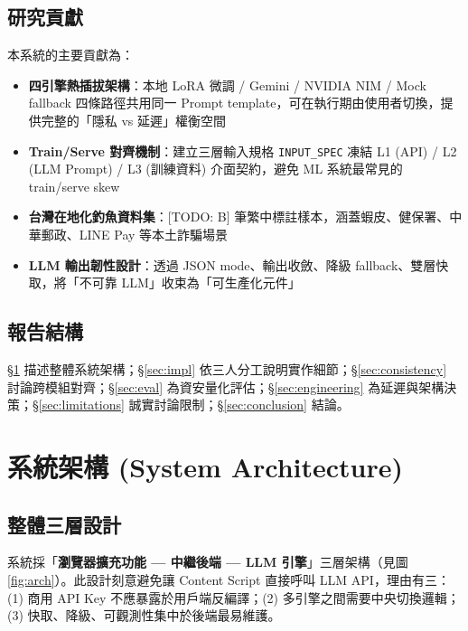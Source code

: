 \documentclass[11pt, a4paper]{article}
\begin{document}
\subsection{研究貢獻}
本系統的主要貢獻為：
\begin{itemize}[leftmargin=2em]
  \item \textbf{四引擎熱插拔架構}：本地 LoRA 微調 / Gemini / NVIDIA NIM / Mock fallback 四條路徑共用同一 Prompt template，可在執行期由使用者切換，提供完整的「隱私 vs 延遲」權衡空間
  \item \textbf{Train/Serve 對齊機制}：建立三層輸入規格 \texttt{INPUT\_SPEC} 凍結 L1 (API) / L2 (LLM Prompt) / L3 (訓練資料) 介面契約，避免 ML 系統最常見的 train/serve skew
  \item \textbf{台灣在地化釣魚資料集}：[TODO: B] 筆繁中標註樣本，涵蓋蝦皮、健保署、中華郵政、LINE Pay 等本土詐騙場景
  \item \textbf{LLM 輸出韌性設計}：透過 JSON mode、輸出收斂、降級 fallback、雙層快取，將「不可靠 LLM」收束為「可生產化元件」
\end{itemize}

\subsection{報告結構}
\S\ref{sec:arch} 描述整體系統架構；\S\ref{sec:impl} 依三人分工說明實作細節；\S\ref{sec:consistency} 討論跨模組對齊；\S\ref{sec:eval} 為資安量化評估；\S\ref{sec:engineering} 為延遲與架構決策；\S\ref{sec:limitations} 誠實討論限制；\S\ref{sec:conclusion} 結論。

\section{系統架構 (System Architecture)}\label{sec:arch}

\subsection{整體三層設計}
系統採「\textbf{瀏覽器擴充功能 — 中繼後端 — LLM 引擎}」三層架構（見圖 \ref{fig:arch}）。此設計刻意避免讓 Content Script 直接呼叫 LLM API，理由有三：(1) 商用 API Key 不應暴露於用戶端反編譯；(2) 多引擎之間需要中央切換邏輯；(3) 快取、降級、可觀測性集中於後端最易維護。
\end{document}
